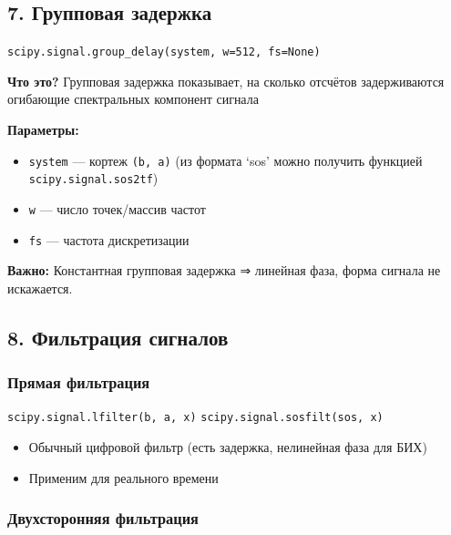 \documentclass[12pt,a4paper,openany]{book}
\providecommand{\tightlist}{\setlength{\itemsep}{0pt}\setlength{\parskip}{0pt}}
\begin{document}
\subsection*{7. Групповая задержка}

\texttt{scipy.\allowbreak{}signal.\allowbreak{}group\_\allowbreak{}delay(\allowbreak{}system,\allowbreak{}\ w=\allowbreak{}512,\allowbreak{}\ fs=\allowbreak{}None)}

\textbf{Что это?}
Групповая задержка показывает, на сколько отсчётов задерживаются огибающие спектральных компонент сигнала

\textbf{Параметры:}

\begin{itemize}
\tightlist
\item
  \texttt{system} --- кортеж \texttt{(\allowbreak{}b,\allowbreak{}\ a)} (из формата `sos' можно получить функцией \texttt{scipy.\allowbreak{}signal.\allowbreak{}sos2tf})
\item
  \texttt{w} --- число точек/массив частот
\item
  \texttt{fs} --- частота дискретизации
\end{itemize}

\textbf{Важно:} Константная групповая задержка ⇒ линейная фаза, форма сигнала не искажается.

\subsection*{8. Фильтрация сигналов}

\subsubsection*{Прямая фильтрация}

\texttt{scipy.\allowbreak{}signal.\allowbreak{}lfilter(\allowbreak{}b,\allowbreak{}\ a,\allowbreak{}\ x)}
\texttt{scipy.\allowbreak{}signal.\allowbreak{}sosfilt(\allowbreak{}sos,\allowbreak{}\ x)}

\begin{itemize}
\tightlist
\item
  Обычный цифровой фильтр (есть задержка, нелинейная фаза для БИХ)
\item
  Применим для реального времени
\end{itemize}

\subsubsection*{Двухсторонняя фильтрация}
\end{document}
